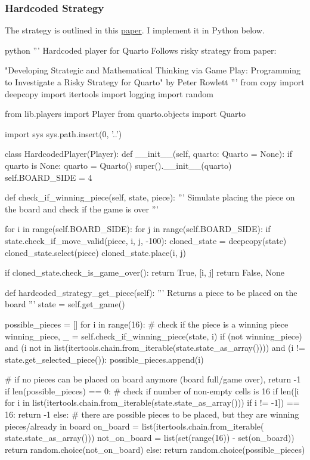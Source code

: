 \subsubsection{Hardcoded Strategy}

The strategy is outlined in this \href{https://scholarworks.umt.edu/cgi/viewcontent.cgi?article=1334&context=tme}{paper}. I implement it in Python below.

\begin{mintedbox}{python}
'''
Hardcoded player for Quarto
Follows risky strategy from paper:

"Developing Strategic and Mathematical Thinking via Game Play:
Programming to Investigate a Risky Strategy for Quarto"
by Peter Rowlett
'''
from copy import deepcopy
import itertools
import logging
import random

from lib.players import Player
from quarto.objects import Quarto

import sys
sys.path.insert(0, '..')

class HardcodedPlayer(Player):
    def __init__(self, quarto: Quarto = None):
        if quarto is None:
            quarto = Quarto()
        super().__init__(quarto)
        self.BOARD_SIDE = 4

    def check_if_winning_piece(self, state, piece):
        '''
        Simulate placing the piece on the board and check if the game is over
        '''

        for i in range(self.BOARD_SIDE):
            for j in range(self.BOARD_SIDE):
                if state.check_if_move_valid(piece, i, j, -100):
                    cloned_state = deepcopy(state)
                    cloned_state.select(piece)
                    cloned_state.place(i, j)

                    if cloned_state.check_is_game_over():
                        return True, [i, j]
        return False, None

    def hardcoded_strategy_get_piece(self):
        '''
        Returns a piece to be placed on the board
        '''
        state = self.get_game()

        possible_pieces = []
        for i in range(16):
            # check if the piece is a winning piece
            winning_piece, _ = self.check_if_winning_piece(state, i)
            if (not winning_piece) and (i not in list(itertools.chain.from_iterable(state.state_as_array()))) and (i != state.get_selected_piece()):
                possible_pieces.append(i)

        # if no pieces can be placed on board anymore (board full/game over), return -1
        if len(possible_pieces) == 0:
            # check if number of non-empty cells is 16
            if len([i for i in list(itertools.chain.from_iterable(state.state_as_array())) if i != -1]) == 16:
                return -1
            else:
                # there are possible pieces to be placed, but they are winning pieces/already in board
                on_board = list(itertools.chain.from_iterable(
                    state.state_as_array()))
                not_on_board = list(set(range(16)) - set(on_board))
                return random.choice(not_on_board)
        else:
            return random.choice(possible_pieces)


\end{mintedbox}
